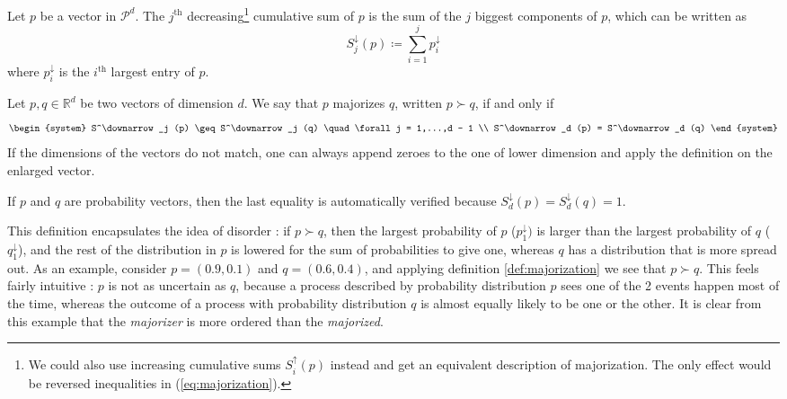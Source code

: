 \begin{definition}[Cumulative sum] %
    Let $p$ be a vector in $\mathcal{P}^d$. The $j^{\text{th}}$ decreasing\footnote{We could also use increasing cumulative sums $S^\uparrow_i (p)$ instead and get an equivalent description of majorization. The only effect would be reversed inequalities in (\ref{eq:majorization}).} cumulative sum of $p$ is the sum of the $j$ biggest components of $p$, which can be written as
    \begin{equation}
        S^\downarrow_j (p) \coloneqq \sum_{i = 1}^{j} p^\downarrow_i
    \end{equation}
    where $p^\downarrow_i$ is the $i^{\text{th}}$ largest entry of $p$. 

\end{definition}
\begin{definition} \label{def:majorization}
    Let $p, q \in \mathbb{R}^d$ be two vectors of dimension $d$. We say that $p$ majorizes $q$, written $p \succ q$, if and only if
    \begin{equation} \label{eq:majorization}
        \begin{system}
            S^\downarrow_j (p) \geq S^\downarrow_j (q) \quad \forall j = 1,...,d - 1 \\
            S^\downarrow_d (p) = S^\downarrow_d (q)
        \end{system}
    \end{equation}
If the dimensions of the vectors do not match, one can always append zeroes to the one of lower dimension and apply the definition on the enlarged vector.
\end{definition}

\begin{remark}
    If $p$ and $q$ are probability vectors, then the last equality is automatically verified because $S^\downarrow_d (p) = S^\downarrow_d (q) = 1$.
\end{remark}

This definition encapsulates the idea of disorder : if $p \succ q$, then the largest probability of $p$ ($p_1^\downarrow)$ is larger than the largest probability of $q$ ($q_1^\downarrow$), and the rest of the distribution in $p$ is lowered for the sum of probabilities to give one, whereas $q$ has a distribution that is more spread out. As an example, consider $p = (0.9, 0.1)$ and $q = (0.6, 0.4)$, and applying definition \ref{def:majorization} we see that $p \succ q$. This feels fairly intuitive : $p$ is not as uncertain as $q$, because a process described by probability distribution $p$ sees one of the 2 events happen most of the time, whereas the outcome of a process with probability distribution $q$ is almost equally likely to be one or the other. It is clear from this example that the \textit{majorizer} is more ordered than the \textit{majorized}.

